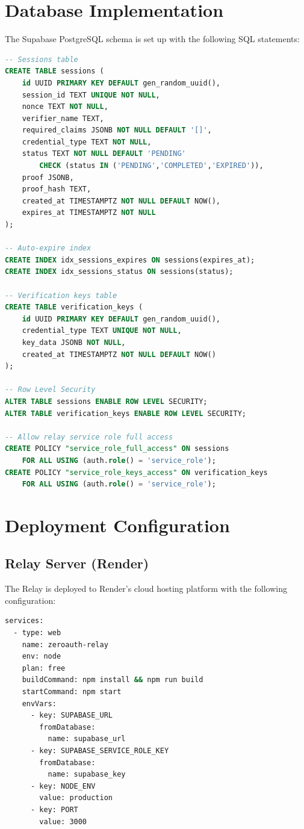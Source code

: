 \section{Database Implementation}

The Supabase PostgreSQL schema is set up with the following SQL statements:

\begin{lstlisting}[language=SQL, caption={Database Schema DDL}]
-- Sessions table
CREATE TABLE sessions (
    id UUID PRIMARY KEY DEFAULT gen_random_uuid(),
    session_id TEXT UNIQUE NOT NULL,
    nonce TEXT NOT NULL,
    verifier_name TEXT,
    required_claims JSONB NOT NULL DEFAULT '[]',
    credential_type TEXT NOT NULL,
    status TEXT NOT NULL DEFAULT 'PENDING'
        CHECK (status IN ('PENDING','COMPLETED','EXPIRED')),
    proof JSONB,
    proof_hash TEXT,
    created_at TIMESTAMPTZ NOT NULL DEFAULT NOW(),
    expires_at TIMESTAMPTZ NOT NULL
);

-- Auto-expire index
CREATE INDEX idx_sessions_expires ON sessions(expires_at);
CREATE INDEX idx_sessions_status ON sessions(status);

-- Verification keys table  
CREATE TABLE verification_keys (
    id UUID PRIMARY KEY DEFAULT gen_random_uuid(),
    credential_type TEXT UNIQUE NOT NULL,
    key_data JSONB NOT NULL,
    created_at TIMESTAMPTZ NOT NULL DEFAULT NOW()
);

-- Row Level Security
ALTER TABLE sessions ENABLE ROW LEVEL SECURITY;
ALTER TABLE verification_keys ENABLE ROW LEVEL SECURITY;

-- Allow relay service role full access
CREATE POLICY "service_role_full_access" ON sessions
    FOR ALL USING (auth.role() = 'service_role');
CREATE POLICY "service_role_keys_access" ON verification_keys
    FOR ALL USING (auth.role() = 'service_role');
\end{lstlisting}

\section{Deployment Configuration}

\subsection{Relay Server (Render)}

The Relay is deployed to Render's cloud hosting platform with the following configuration:

\begin{lstlisting}[language=bash, caption={render.yaml -- Deployment Configuration}]
services:
  - type: web
    name: zeroauth-relay
    env: node
    plan: free
    buildCommand: npm install && npm run build
    startCommand: npm start
    envVars:
      - key: SUPABASE_URL
        fromDatabase:
          name: supabase_url
      - key: SUPABASE_SERVICE_ROLE_KEY
        fromDatabase:
          name: supabase_key
      - key: NODE_ENV
        value: production
      - key: PORT
        value: 3000
\end{lstlisting}


